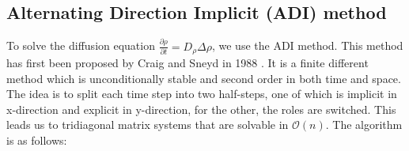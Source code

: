\documentclass[a4paper]{article}
\begin{document}
\subsection{Alternating Direction Implicit (ADI) method}

To solve the diffusion equation $\frac{\partial \rho}{\partial t} = D_\rho \Delta \rho$, we use the ADI method.
This method has first been proposed by Craig and Sneyd in 1988 \cite{Craig_Sneyd_1988}.
It is a finite different method which is unconditionally stable and second order in both time and space.
The idea is to split each time step into two half-steps, one of which is implicit in x-direction and explicit in y-direction, for the other, the roles are switched.
This leads us to tridiagonal matrix systems that are solvable in  $\mathcal{O}(n)$.
The algorithm is as follows:
\end{document}

